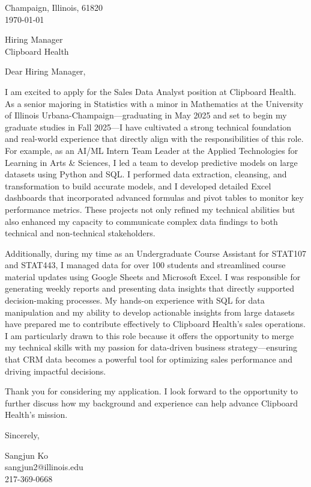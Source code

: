 \documentclass[11pt]{article}
\begin{document}
\noindent
Champaign, Illinois, 61820 \\
\today
\vspace{2em}

\noindent
Hiring Manager\\
Clipboard Health

\vspace{1.5em}

Dear Hiring Manager,

I am excited to apply for the Sales Data Analyst position at Clipboard Health. As a senior majoring in Statistics with a minor in Mathematics at the University of Illinois Urbana-Champaign—graduating in May 2025 and set to begin my graduate studies in Fall 2025—I have cultivated a strong technical foundation and real-world experience that directly align with the responsibilities of this role. For example, as an AI/ML Intern Team Leader at the Applied Technologies for Learning in Arts \& Sciences, I led a team to develop predictive models on large datasets using Python and SQL. I performed data extraction, cleansing, and transformation to build accurate models, and I developed detailed Excel dashboards that incorporated advanced formulas and pivot tables to monitor key performance metrics. These projects not only refined my technical abilities but also enhanced my capacity to communicate complex data findings to both technical and non-technical stakeholders.

Additionally, during my time as an Undergraduate Course Assistant for STAT107 and STAT443, I managed data for over 100 students and streamlined course material updates using Google Sheets and Microsoft Excel. I was responsible for generating weekly reports and presenting data insights that directly supported decision-making processes. My hands-on experience with SQL for data manipulation and my ability to develop actionable insights from large datasets have prepared me to contribute effectively to Clipboard Health’s sales operations. I am particularly drawn to this role because it offers the opportunity to merge my technical skills with my passion for data-driven business strategy—ensuring that CRM data becomes a powerful tool for optimizing sales performance and driving impactful decisions.

Thank you for considering my application. I look forward to the opportunity to further discuss how my background and experience can help advance Clipboard Health’s mission.

\vspace{1em}

Sincerely,

\vspace{2em}

\noindent
Sangjun Ko\\
sangjun2@illinois.edu\\
217-369-0668
\end{document}
